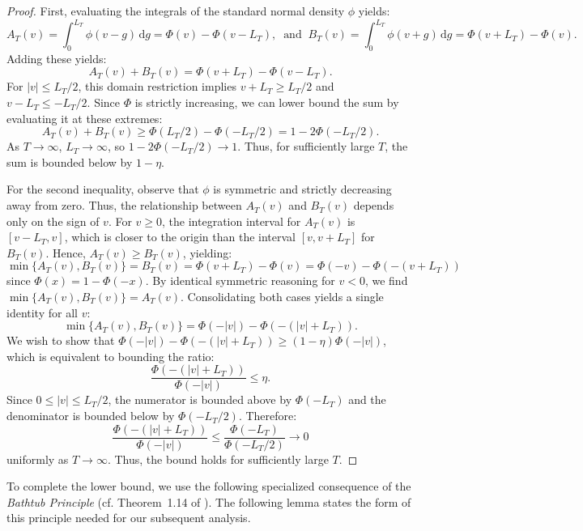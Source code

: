 \documentclass[10pt]{article}
\newcommand{\dd}{\mathrm{d}}
\theoremstyle{plain}
\begin{document}
\begin{proof}
First, evaluating the integrals of the standard normal density $\phi$ yields:
$$  A_T(v) = \int_0^{L_T}\phi(v-g)\,\dd g = \Phi(v) - \Phi(v-L_T),\;\;\mbox{and}\;\;
B_T(v) = \int_0^{L_T}\phi(v+g)\,\dd g = \Phi(v+L_T) - \Phi(v).$$
Adding these yields:
$$A_T(v) + B_T(v) = \Phi(v+L_T) - \Phi(v-L_T).$$
For $|v| \le L_T/2$, this domain restriction implies $v+L_T \ge L_T/2$ and $v-L_T \le -L_T/2$. Since $\Phi$ is strictly increasing, we can lower bound the sum by evaluating it at these extremes:
$$A_T(v) + B_T(v) \ge \Phi(L_T/2) - \Phi(-L_T/2) = 1 - 2\Phi(-L_T/2).$$
As $T \to \infty$, $L_T \to \infty$, so $1 - 2\Phi(-L_T/2) \to 1$. Thus, for sufficiently large $T$, the sum is bounded below by $1-\eta$.

For the second inequality, observe that $\phi$ is symmetric and strictly decreasing away from zero. Thus, the relationship between $A_T(v)$ and $B_T(v)$ depends only on the sign of $v$. For $v \ge 0$, the integration interval for $A_T(v)$ is $[v-L_T, v]$, which is closer to the origin than the interval $[v, v+L_T]$ for $B_T(v)$. Hence, $A_T(v) \ge B_T(v)$, yielding:
$$
\min\{A_T(v), B_T(v)\} = B_T(v) 
= \Phi(v+L_T) - \Phi(v)
= \Phi(-v) - \Phi(-(v+L_T))
$$
since $\Phi(x) = 1 - \Phi(-x)$.
By identical symmetric reasoning for $v < 0$, we find $\min\{A_T(v), B_T(v)\} = A_T(v)$. Consolidating both cases yields a single identity for all $v$:
\begin{equation}\label{eq:min_AB_with_Phi}
    \min\{A_T(v), B_T(v)\} = \Phi(-|v|) - \Phi(-(|v|+L_T)).
\end{equation}
We wish to show that $\Phi(-|v|) - \Phi(-(|v|+L_T)) \ge (1-\eta)\Phi(-|v|)$, which is equivalent to bounding the ratio:
$$\frac{\Phi(-(|v|+L_T))}{\Phi(-|v|)} \le \eta.$$
Since $0 \le |v| \le L_T/2$, the numerator is bounded above by $\Phi(-L_T)$ and the denominator is bounded below by $\Phi(-L_T/2)$. Therefore:
$$\frac{\Phi(-(|v|+L_T))}{\Phi(-|v|)} \le \frac{\Phi(-L_T)}{\Phi(-L_T/2)} \to 0$$
uniformly as $T \to \infty$. Thus, the bound holds for sufficiently large $T$.  
\end{proof}



To complete the lower bound, we use the following specialized consequence of
the \emph{Bathtub Principle} (cf. Theorem~1.14 of \citet{Lieb2001Analysis}). The following lemma states the form of this principle needed for our subsequent analysis.


\end{document}
